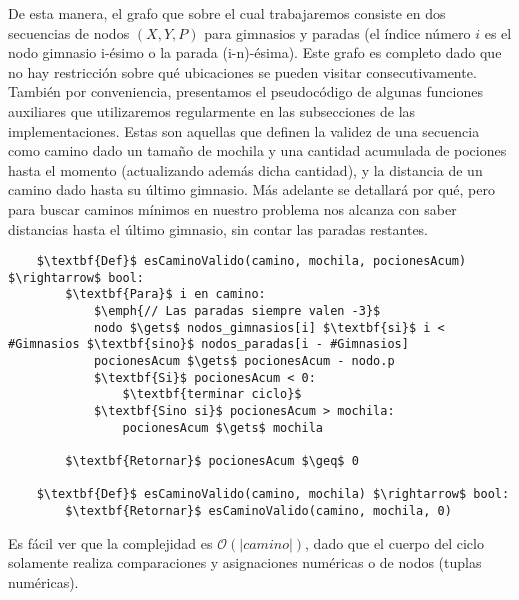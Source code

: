    De esta manera, el grafo que sobre el cual trabajaremos consiste en dos secuencias de nodos $(X, Y, P)$ para gimnasios y paradas (el índice número $i$ es el nodo gimnasio i-ésimo o la parada (i-n)-ésima). Este grafo es completo dado que no hay restricción sobre qué ubicaciones se pueden visitar consecutivamente.
   \\

   También por conveniencia, presentamos el pseudocódigo de algunas funciones auxiliares que utilizaremos regularmente en las subsecciones de las implementaciones. Estas son aquellas que definen la validez de una secuencia como camino dado un tamaño de mochila y una cantidad acumulada de pociones hasta el momento (actualizando además dicha cantidad), y la distancia de un camino dado hasta su último gimnasio. Más adelante se detallará por qué, pero para buscar caminos mínimos en nuestro problema nos alcanza con saber distancias hasta el último gimnasio, sin contar las paradas restantes.
   \\

   \begin{lstlisting}
    $\textbf{Def}$ esCaminoValido(camino, mochila, pocionesAcum) $\rightarrow$ bool:
        $\textbf{Para}$ i en camino:
            $\emph{// Las paradas siempre valen -3}$
            nodo $\gets$ nodos_gimnasios[i] $\textbf{si}$ i < #Gimnasios $\textbf{sino}$ nodos_paradas[i - #Gimnasios]
            pocionesAcum $\gets$ pocionesAcum - nodo.p
            $\textbf{Si}$ pocionesAcum < 0:
                $\textbf{terminar ciclo}$
            $\textbf{Sino si}$ pocionesAcum > mochila:
                pocionesAcum $\gets$ mochila

        $\textbf{Retornar}$ pocionesAcum $\geq$ 0

    $\textbf{Def}$ esCaminoValido(camino, mochila) $\rightarrow$ bool:
        $\textbf{Retornar}$ esCaminoValido(camino, mochila, 0)
   \end{lstlisting}

   Es fácil ver que la complejidad es $\mathcal{O}(|camino|)$, dado que el cuerpo del ciclo solamente realiza comparaciones y asignaciones numéricas o de nodos (tuplas numéricas).

